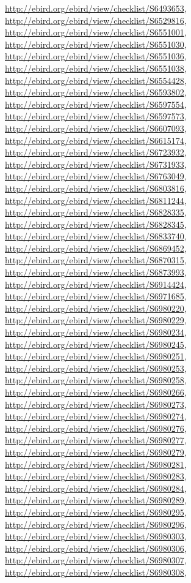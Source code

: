\documentclass[9pt, article]{memoir}
\begin{document}
\begin{multicols}{2}
\url{http://ebird.org/ebird/view/checklist/S6493653}, 
\url{http://ebird.org/ebird/view/checklist/S6529816}, 
\url{http://ebird.org/ebird/view/checklist/S6551001}, 
\url{http://ebird.org/ebird/view/checklist/S6551030}, 
\url{http://ebird.org/ebird/view/checklist/S6551036}, 
\url{http://ebird.org/ebird/view/checklist/S6551038}, 
\url{http://ebird.org/ebird/view/checklist/S6554428}, 
\url{http://ebird.org/ebird/view/checklist/S6593802}, 
\url{http://ebird.org/ebird/view/checklist/S6597554}, 
\url{http://ebird.org/ebird/view/checklist/S6597573}, 
\url{http://ebird.org/ebird/view/checklist/S6607093}, 
\url{http://ebird.org/ebird/view/checklist/S6615174}, 
\url{http://ebird.org/ebird/view/checklist/S6723932}, 
\url{http://ebird.org/ebird/view/checklist/S6731933}, 
\url{http://ebird.org/ebird/view/checklist/S6763049}, 
\url{http://ebird.org/ebird/view/checklist/S6803816}, 
\url{http://ebird.org/ebird/view/checklist/S6811244}, 
\url{http://ebird.org/ebird/view/checklist/S6828335}, 
\url{http://ebird.org/ebird/view/checklist/S6828345}, 
\url{http://ebird.org/ebird/view/checklist/S6833740}, 
\url{http://ebird.org/ebird/view/checklist/S6869452}, 
\url{http://ebird.org/ebird/view/checklist/S6870315}, 
\url{http://ebird.org/ebird/view/checklist/S6873993}, 
\url{http://ebird.org/ebird/view/checklist/S6914424}, 
\url{http://ebird.org/ebird/view/checklist/S6971685}, 
\url{http://ebird.org/ebird/view/checklist/S6980220}, 
\url{http://ebird.org/ebird/view/checklist/S6980229}, 
\url{http://ebird.org/ebird/view/checklist/S6980234}, 
\url{http://ebird.org/ebird/view/checklist/S6980245}, 
\url{http://ebird.org/ebird/view/checklist/S6980251}, 
\url{http://ebird.org/ebird/view/checklist/S6980253}, 
\url{http://ebird.org/ebird/view/checklist/S6980258}, 
\url{http://ebird.org/ebird/view/checklist/S6980266}, 
\url{http://ebird.org/ebird/view/checklist/S6980273}, 
\url{http://ebird.org/ebird/view/checklist/S6980274}, 
\url{http://ebird.org/ebird/view/checklist/S6980276}, 
\url{http://ebird.org/ebird/view/checklist/S6980277}, 
\url{http://ebird.org/ebird/view/checklist/S6980279}, 
\url{http://ebird.org/ebird/view/checklist/S6980281}, 
\url{http://ebird.org/ebird/view/checklist/S6980283}, 
\url{http://ebird.org/ebird/view/checklist/S6980284}, 
\url{http://ebird.org/ebird/view/checklist/S6980289}, 
\url{http://ebird.org/ebird/view/checklist/S6980295}, 
\url{http://ebird.org/ebird/view/checklist/S6980296}, 
\url{http://ebird.org/ebird/view/checklist/S6980303}, 
\url{http://ebird.org/ebird/view/checklist/S6980306}, 
\url{http://ebird.org/ebird/view/checklist/S6980307}, 
\url{http://ebird.org/ebird/view/checklist/S6980308}, 

\end{multicols}
\end{document}
